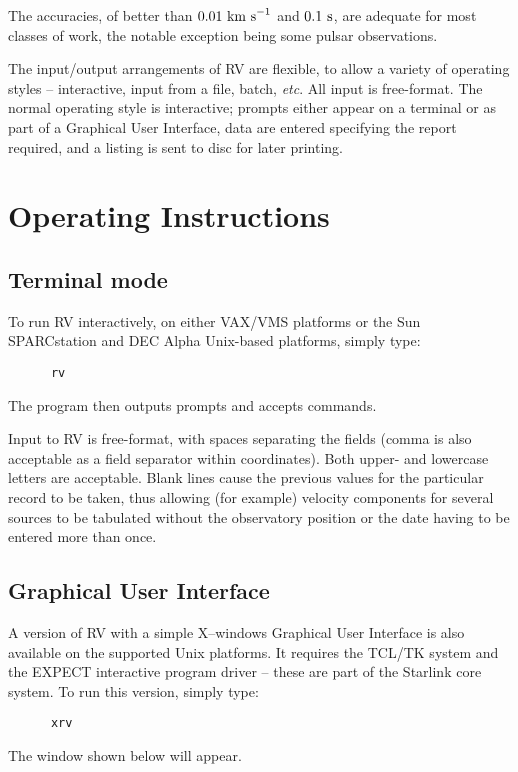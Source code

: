 The accuracies, of better than $0.01~{\rm km~s}^{-1}$ and $0.1~{\rm s}$, are
adequate for most classes of work, the notable exception
being some pulsar observations.

The input/output arrangements of RV are flexible, to allow a variety of
operating styles -- interactive, input from a file, batch, {\it etc}.
All input is free-format. The normal operating style is interactive;
prompts either appear on a terminal or as part of a Graphical User
Interface, data are entered specifying the report required, and a
listing is sent to disc for later printing.

\section{Operating Instructions}
\subsection{Terminal mode}

To run RV interactively, on either VAX/VMS platforms or
the Sun SPARCstation and DEC Alpha Unix-based platforms, simply type:
\begin{verbatim}
      rv
\end{verbatim}
The program then outputs prompts and accepts commands.

Input to RV is free-format, with spaces separating the fields (comma is
also acceptable as a field separator within coordinates).  Both upper-
and lowercase letters are acceptable.  Blank lines cause the previous
values for the particular record to be taken, thus allowing (for
example) velocity components for several sources to be tabulated
without the observatory position or the date having to be entered more
than once.

\subsection{Graphical User Interface}

A version of RV with a simple X--windows Graphical User Interface is
also available on the supported Unix platforms. It requires the TCL/TK
system and the EXPECT interactive program driver -- these are part of the
Starlink core system.  To run this version, simply type:

\begin{verbatim}
      xrv
\end{verbatim}

The window shown below will appear.

